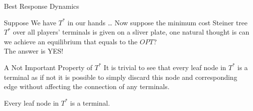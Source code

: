\documentclass[11pt,aspectratio=169]{beamer}
\begin{document}
\begin{frame}{Best Response Dynamics}
    \centering
    
\end{frame}

\begin{frame}{Suppose We have $T^*$ in our hands \dots}
Now suppose the minimum cost Steiner tree \(T^*\) over all players' terminals is given on a sliver plate, one natural thought is can we achieve an equilibrium that equals to the \(OPT\)?  \\
\vspace{10pt}
The answer is YES!
\end{frame}

\begin{frame}{A Not Important Property of $T^*$}
    It is trivial to see that every leaf node in \(T^*\) is a terminal as if not it is possible to simply discard this node and corresponding edge without affecting the connection of any terminals.
    \vspace{10pt}
\begin{fact}
	Every leaf node in \(T^*\) is a terminal. 
\end{fact}
\end{frame}
\end{document}
